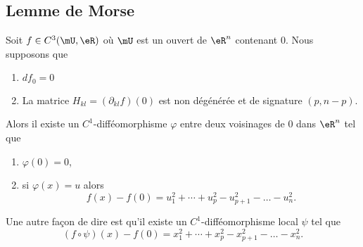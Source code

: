\subsection{Lemme de Morse}

\begin{lemma}     \label{LemNQAmCLo}
	Soit \( f\in C^3(\mU,\eR)\) où \( \mU\) est un ouvert de \( \eR^n\) contenant \( 0\). Nous supposons que
	\begin{enumerate}
		\item
		      \( df_0=0\)
		\item
		      La matrice  \( H_{kl}=(\partial_{kl}f)(0) \) est non dégénérée et de signature \( (p,n-p)\).
	\end{enumerate}
	Alors il existe un \( C^1\)-difféomorphisme \( \varphi\) entre deux voisinages de \( 0\) dans \( \eR^n\) tel que
	\begin{enumerate}
		\item
		      \( \varphi(0)=0\),
		\item
		      si \( \varphi(x)=u\) alors
		      \begin{equation}
			      f(x)-f(0)=u_1^2+\cdots +u_p^2-u_{p+1}^2-\ldots-u_n^2.
		      \end{equation}
	\end{enumerate}
	Une autre façon de dire est qu'il existe un \( C^1\)-difféomorphisme local \( \psi\) tel que
	\begin{equation}
		(f\circ\psi)(x)-f(0)=x_1^2+\cdots +x_p^2-x_{p+1}^2-\ldots-x_n^2.
	\end{equation}
\end{lemma}

